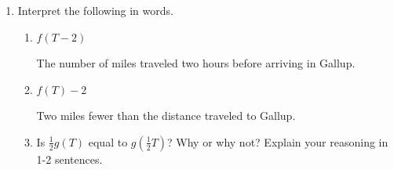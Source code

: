 \documentclass{article}
\begin{document}
\begin{enumerate}
\begin{enumerate}
\begin{enumerate}

    \end{enumerate}

  \item Interpret the following in words.

    \begin{enumerate}

    \item 
      \begin{problem}[\vfill]
        $f(T-2)$
      \end{problem}

      \begin{solution}
        The number of miles traveled two hours before arriving in Gallup.   
      \end{solution}

    \item
      \begin{problem}[\vfill]
        $f(T) -2$
      \end{problem}

      \begin{solution}
        Two miles fewer than the distance traveled to Gallup.    
      \end{solution}





      \item
      \begin{problem}[\vfill]
        Is $\frac{1}{2}g(T)$ equal to $g\left(\frac{1}{2}T\right)$? Why or why not? Explain your reasoning in 1-2 sentences.
      \end{problem}


\end{enumerate}
\end{enumerate}
\end{enumerate}
\end{document}
